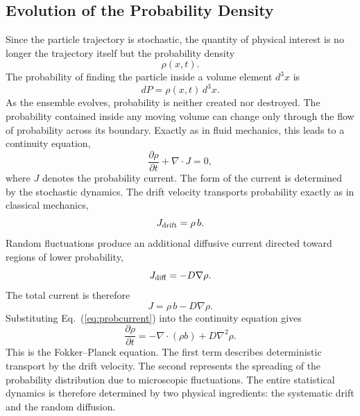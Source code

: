 \subsection{Evolution of the Probability Density}
Since the particle trajectory is stochastic, the quantity of physical
interest is no longer the trajectory itself but the probability density
\[\rho(x,t).\]
The probability of finding the particle inside a volume element $d^3x$
is
\[dP=\rho(x,t)\,d^3x.\]
As the ensemble evolves, probability is neither created nor destroyed.
The probability contained inside any moving volume can change only
through the flow of probability across its boundary.
Exactly as in fluid mechanics, this leads to a continuity equation,
\begin{equation}
\frac{\partial\rho}{\partial t}+\nabla\cdot J=0,
\label{eq:continuity}
\end{equation}
where $J$ denotes the probability current.
The form of the current is determined by the stochastic dynamics.
The drift velocity transports probability exactly as in classical
mechanics,
\[J_{\rm drift}=\rho\,b.\]
Random fluctuations produce an additional diffusive current directed
toward regions of lower probability,
\[J_{\rm diff}=-D\nabla\rho.\]
The total current is therefore
\begin{equation}
J=\rho\,b-D\nabla\rho.
\label{eq:probcurrent}
\end{equation}
Substituting Eq.~(\ref{eq:probcurrent}) into the continuity equation
gives
\begin{equation}
\boxed{\frac{\partial\rho}{\partial t}=-\nabla\cdot(\rho b)+D\nabla^2\rho.}
\label{eq:FokkerPlanck}
\end{equation}
This is the Fokker--Planck equation.
The first term describes deterministic transport by the drift velocity.
The second represents the spreading of the probability distribution due
to microscopic fluctuations.
The entire statistical dynamics is therefore determined by two physical
ingredients: the systematic drift and the random diffusion.
